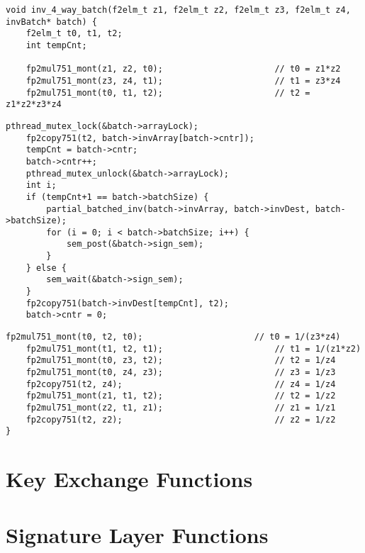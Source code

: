 \begin{lstlisting}
void inv_4_way_batch(f2elm_t z1, f2elm_t z2, f2elm_t z3, f2elm_t z4, invBatch* batch) {
  	f2elm_t t0, t1, t2;
	int tempCnt;

    fp2mul751_mont(z1, z2, t0);                      // t0 = z1*z2
    fp2mul751_mont(z3, z4, t1);                      // t1 = z3*z4
    fp2mul751_mont(t0, t1, t2);                      // t2 = z1*z2*z3*z4
\end{lstlisting}
\vspace{-\baselineskip}
\begin{lstlisting}[backgroundcolor = \color{light-green}, firstnumber=8]
	pthread_mutex_lock(&batch->arrayLock);
	fp2copy751(t2, batch->invArray[batch->cntr]);
	tempCnt = batch->cntr;
	batch->cntr++; 
	pthread_mutex_unlock(&batch->arrayLock);
	int i;		
	if (tempCnt+1 == batch->batchSize) {
		partial_batched_inv(batch->invArray, batch->invDest, batch->batchSize);
		for (i = 0; i < batch->batchSize; i++) {
			sem_post(&batch->sign_sem);			
		}
	} else {
		sem_wait(&batch->sign_sem);
	}
	fp2copy751(batch->invDest[tempCnt], t2);
	batch->cntr = 0;
\end{lstlisting}
\vspace{-\baselineskip}
\begin{lstlisting}[firstnumber=24]
    fp2mul751_mont(t0, t2, t0);                      // t0 = 1/(z3*z4) 
    fp2mul751_mont(t1, t2, t1);                      // t1 = 1/(z1*z2) 
    fp2mul751_mont(t0, z3, t2);                      // t2 = 1/z4
    fp2mul751_mont(t0, z4, z3);                      // z3 = 1/z3
    fp2copy751(t2, z4);                              // z4 = 1/z4
    fp2mul751_mont(z1, t1, t2);                      // t2 = 1/z2
    fp2mul751_mont(z2, t1, z1);                      // z1 = 1/z1
    fp2copy751(t2, z2);                              // z2 = 1/z2
}
\end{lstlisting}

\section{Key Exchange Functions}

\section{Signature Layer Functions}
